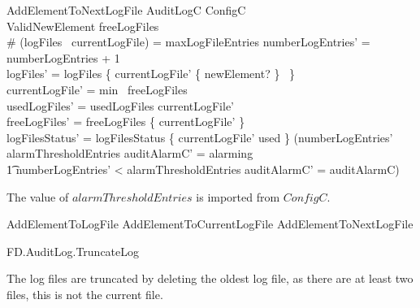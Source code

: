 \begin{schema}{AddElementToNextLogFile}
        \Delta AuditLogC
\also
        ConfigC
\\      ValidNewElement
\where
        freeLogFiles \neq \emptyset
\\      \# (logFiles~ currentLogFile) = maxLogFileEntries
\also
        numberLogEntries' = numberLogEntries + 1 
\\      logFiles' = logFiles \oplus \{ currentLogFile' \mapsto \{ newElement? \}~ \}
\\      currentLogFile' = min~ freeLogFiles 
\\      usedLogFiles' = usedLogFiles \cat \langle currentLogFile' \rangle
\\      freeLogFiles' = freeLogFiles \setminus \{ currentLogFile' \}
\\      logFilesStatus' = logFilesStatus \oplus \{ currentLogFile'
\mapsto used \}
\also
      (numberLogEntries' \geq alarmThresholdEntries \land auditAlarmC' = alarming
\\ \t1   \lor numberLogEntries' < alarmThresholdEntries \land
auditAlarmC' = auditAlarmC)
\end{schema}
\begin{Zcomment}
\item
The value of $alarmThresholdEntries$ is imported from $ConfigC$. 
\end{Zcomment}

\begin{zed}
AddElementToLogFile  AddElementToCurrentLogFile \lor AddElementToNextLogFile
\end{zed}

\begin{traceunit}{FD.AuditLog.TruncateLog}
\end{traceunit}



The log files are truncated by deleting the oldest log file, as there
are at least two files, this is not the current file.

